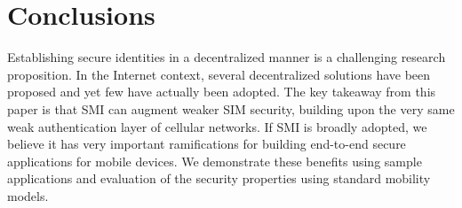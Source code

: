 \documentclass[letterpaper,twocolumn]{sig-alternate}
\begin{document}
 \section{Conclusions}

Establishing secure identities in a decentralized manner is a challenging research proposition. In the Internet context, several decentralized solutions have been proposed and yet few have actually been adopted. The key takeaway from this paper is that SMI can augment weaker SIM security, building upon the very same weak authentication layer of cellular networks. 
If SMI is broadly adopted, we believe it has very important ramifications for building end-to-end secure applications for mobile devices. We demonstrate these benefits using sample applications and evaluation of the security properties using standard mobility models. 



 
\newpage


\end{document}

